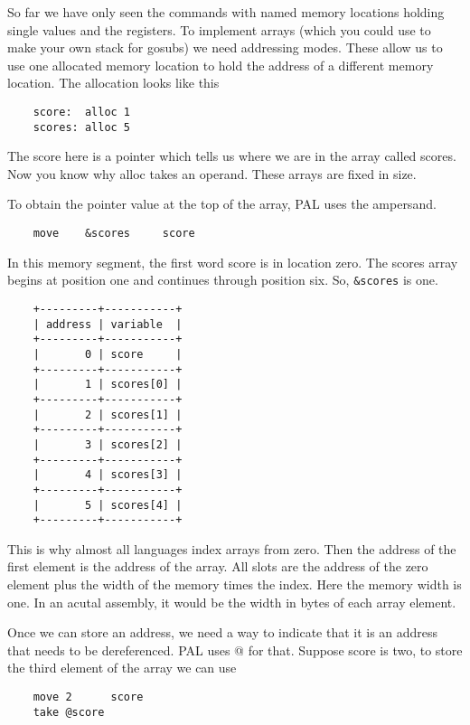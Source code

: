 So far we have only seen the commands with named memory locations
holding single values and the registers. To implement arrays (which
you could use to make your own stack for gosubs) we need addressing modes.
These allow us to use one allocated memory location to hold the
address of a different memory location. The allocation looks like
this

{\footnotesize
\begin{verbatim}
    score:  alloc 1
    scores: alloc 5
\end{verbatim}
}

The score here is a pointer which tells us where we are in the array
called scores. Now you know why alloc takes an operand. These arrays
are fixed in size.

To obtain the pointer value at the top of the array, PAL uses the
ampersand.

{\footnotesize
\begin{verbatim}
    move    &scores     score
\end{verbatim}
}

In this memory segment, the first word score is in location zero.
The scores array begins at position one and continues through position
six. So, \verb+&scores+ is one.

{\footnotesize
\begin{verbatim}
    +---------+-----------+
    | address | variable  |
    +---------+-----------+
    |       0 | score     |
    +---------+-----------+
    |       1 | scores[0] |
    +---------+-----------+
    |       2 | scores[1] |
    +---------+-----------+
    |       3 | scores[2] |
    +---------+-----------+
    |       4 | scores[3] |
    +---------+-----------+
    |       5 | scores[4] |
    +---------+-----------+
\end{verbatim}
}

This is why almost all languages index arrays from zero. Then the address
of the first element is the address of the array. All slots are
the address of the zero element plus the width of the memory times the index.
Here the memory width is one. In an acutal assembly, it would be the
width in bytes of each array element.

Once we can store an address, we need a way to indicate that it is
an address that needs to be dereferenced. PAL uses @ for that.
Suppose score is two, to store the third element of the array we
can use

{\footnotesize
\begin{verbatim}
    move 2      score
    take @score
\end{verbatim}
}

